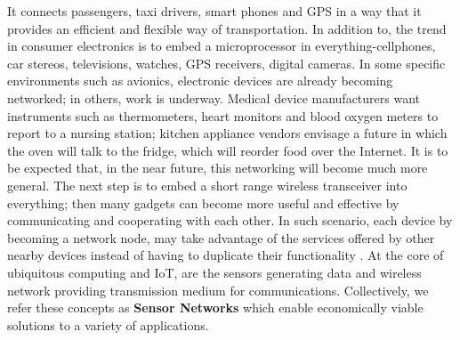 	It connects passengers, taxi drivers, smart phones and GPS in a way that it provides an efficient and flexible way of transportation.
	In addition to, the trend in consumer electronics is to embed a microprocessor in everything-cellphones, car stereos,  televisions, watches, GPS receivers, digital cameras.
	In some specific environments such as avionics, electronic devices are already becoming networked; in others, work is underway.
	Medical device manufacturers want instruments such as thermometers, heart monitors and blood oxygen meters to report to a nursing station; kitchen appliance vendors envisage a future in which the oven will talk to the fridge, which will reorder food over the Internet. 
	It is to be expected that, in the near future, this networking will become much more general.
	The next step is to embed a short range wireless transceiver into everything; then many gadgets can become more useful and effective by communicating and cooperating with each other.
	In such scenario, each device by becoming a network node, may take advantage of the services offered by other nearby devices instead of having to duplicate their functionality \cite{2002-Stajano-ubiquitous}.
	At the core of ubiquitous computing and IoT, are the sensors generating data and wireless network providing transmission medium for communications. 
	Collectively, we refer these concepts as \textbf{Sensor Networks} which enable economically viable solutions to a variety of applications.


